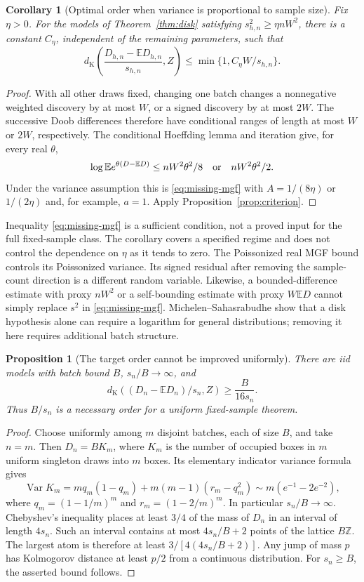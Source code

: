 \documentclass[11pt]{article}
\numberwithin{equation}{section}
\newtheorem{proposition}[theorem]{Proposition}
\newtheorem{corollary}[theorem]{Corollary}
\theoremstyle{remark}\newtheorem{remark}[theorem]{Remark}
\newcommand{\E}{\mathbb E}\newcommand{\Pp}{\mathbb P}
\newcommand{\Var}{\operatorname{Var}}\newcommand{\ind}{\mathbf1}
\newcommand{\dK}{d_{\mathrm K}}\newcommand{\calZ}{\mathcal Z}
\begin{document}
\begin{corollary}[Optimal order when variance is proportional to sample size]
\label{cor:nondegenerate}
Fix $\eta>0$. For the models of Theorem~\ref{thm:disk} satisfying
$s_{h,n}^2\ge\eta nW^2$, there is a constant $C_\eta$, independent of
the remaining parameters, such that
\[
 \dK\left(\frac{D_{h,n}-\E D_{h,n}}{s_{h,n}},Z\right)
 \le\min\{1,C_\eta W/s_{h,n}\}.
\]
\end{corollary}
\begin{proof}
With all other draws fixed, changing one batch changes a nonnegative
weighted discovery by at most $W$, or a signed discovery by at most
$2W$. The successive Doob differences therefore have conditional ranges
of length at most $W$ or $2W$, respectively. The conditional Hoeffding
lemma and iteration give, for every real $\theta$,
\[
 \log\E e^{\theta(D-\E D)}
 \le nW^2\theta^2/8\quad\hbox{or}\quad nW^2\theta^2/2.
\]
Under the variance assumption this is \eqref{eq:missing-mgf} with
$A=1/(8\eta)$ or $1/(2\eta)$ and, for example, $a=1$.
Apply Proposition~\ref{prop:criterion}.
\end{proof}

Inequality \eqref{eq:missing-mgf} is a sufficient condition, not a
proved input for the full fixed-sample class. The corollary covers a
specified regime and does not control the dependence on $\eta$ as it
tends to zero. The Poissonized real MGF bound controls its
Poissonized variance. Its signed residual after removing the sample-count
direction is a different random variable. Likewise, a bounded-difference
estimate with proxy $nW^2$ or a self-bounding estimate with proxy
$W\E D$ cannot simply replace $s^2$ in \eqref{eq:missing-mgf}.
Michelen--Sahasrabudhe \cite[Theorem~11.4]{MS} show that a disk hypothesis
alone can require a logarithm for general distributions; removing it here
requires additional batch structure.

\begin{proposition}[The target order cannot be improved uniformly]
\label{prop:lower}
There are iid models with batch bound $B$, $s_n/B\to\infty$, and
\[
 \dK((D_n-\E D_n)/s_n,Z)\ge\frac{B}{16s_n}.
\]
Thus $B/s_n$ is a necessary order for a uniform fixed-sample theorem.
\end{proposition}
\begin{proof}
Choose uniformly among $m$ disjoint batches, each of size $B$, and take
$n=m$. Then $D_n=BK_m$, where $K_m$ is the number of occupied boxes in
$m$ uniform singleton draws into $m$ boxes. Its elementary indicator
variance formula gives
\[
 \Var K_m=mq_m(1-q_m)+m(m-1)(r_m-q_m^2)
 \sim m(e^{-1}-2e^{-2}),
\]
where $q_m=(1-1/m)^m$ and $r_m=(1-2/m)^m$.
In particular $s_n/B\to\infty$. Chebyshev's inequality places at least
$3/4$ of the mass of $D_n$ in an interval of length $4s_n$. Such an
interval contains at most $4s_n/B+2$ points of the lattice $B\mathbb Z$.
The largest atom is therefore at least $3/[4(4s_n/B+2)]$.
Any jump of mass $p$ has Kolmogorov distance at least $p/2$ from a
continuous distribution. For $s_n\ge B$, the asserted bound follows.
\end{proof}
\end{document}
